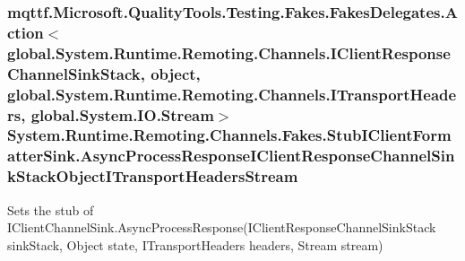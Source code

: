 \hypertarget{class_system_1_1_runtime_1_1_remoting_1_1_channels_1_1_fakes_1_1_stub_i_client_formatter_sink_a69d71b4a8978d920bdb48851d23f4dc7}{
\subsubsection[{Async\-Process\-Response\-I\-Client\-Response\-Channel\-Sink\-Stack\-Object\-I\-Transport\-Headers\-Stream}]{\setlength{\rightskip}{0pt plus 5cm}mqttf.\-Microsoft.\-Quality\-Tools.\-Testing.\-Fakes.\-Fakes\-Delegates.\-Action$<$global.\-System.\-Runtime.\-Remoting.\-Channels.\-I\-Client\-Response\-Channel\-Sink\-Stack, object, global.\-System.\-Runtime.\-Remoting.\-Channels.\-I\-Transport\-Headers, global.\-System.\-I\-O.\-Stream$>$ System.\-Runtime.\-Remoting.\-Channels.\-Fakes.\-Stub\-I\-Client\-Formatter\-Sink.\-Async\-Process\-Response\-I\-Client\-Response\-Channel\-Sink\-Stack\-Object\-I\-Transport\-Headers\-Stream}}\label{class_system_1_1_runtime_1_1_remoting_1_1_channels_1_1_fakes_1_1_stub_i_client_formatter_sink_a69d71b4a8978d920bdb48851d23f4dc7}


Sets the stub of I\-Client\-Channel\-Sink.\-Async\-Process\-Response(\-I\-Client\-Response\-Channel\-Sink\-Stack sink\-Stack, Object state, I\-Transport\-Headers headers, Stream stream)

